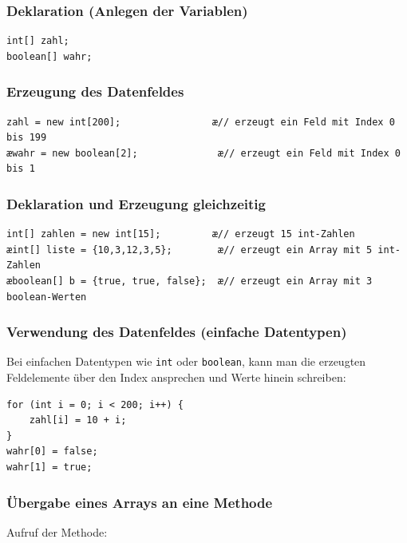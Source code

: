 \subsubsection{Deklaration (Anlegen der Variablen)}

\begin{lstlisting}
int[] zahl;
boolean[] wahr;
\end{lstlisting}

\subsubsection{Erzeugung des Datenfeldes}

\begin{lstlisting}
zahl = new int[200];                æ// erzeugt ein Feld mit Index 0 bis 199
æwahr = new boolean[2];              æ// erzeugt ein Feld mit Index 0 bis 1
\end{lstlisting}

\subsubsection{Deklaration und Erzeugung gleichzeitig}

\begin{lstlisting}
int[] zahlen = new int[15];         æ// erzeugt 15 int-Zahlen
æint[] liste = {10,3,12,3,5};        æ// erzeugt ein Array mit 5 int-Zahlen
æboolean[] b = {true, true, false};  æ// erzeugt ein Array mit 3 boolean-Werten
\end{lstlisting}

\subsubsection{Verwendung des Datenfeldes (einfache Datentypen)}

Bei einfachen Datentypen wie \lstinline|int| oder \lstinline|boolean|,
kann man die erzeugten Feldelemente über den Index ansprechen und Werte
hinein schreiben:

\begin{lstlisting}
for (int i = 0; i < 200; i++) {
    zahl[i] = 10 + i;
}
wahr[0] = false;
wahr[1] = true;
\end{lstlisting}

\subsubsection{Übergabe eines Arrays an eine Methode}

Aufruf der Methode:

